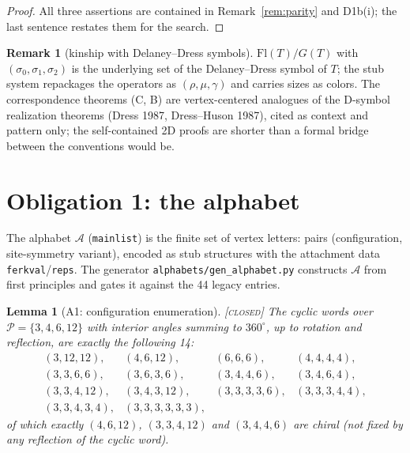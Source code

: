 \documentclass[11pt]{article}
\newtheorem{lemma}[theorem]{Lemma}
\theoremstyle{definition}
\newtheorem{remark}[theorem]{Remark}
\newcommand{\CLOSED}{\textnormal{\textsc{[closed]}}}
\newcommand{\Flags}{\mathrm{Fl}}
\newcommand{\A}{\mathcal{A}}
\begin{document}
\begin{proof}
All three assertions are contained in Remark~\ref{rem:parity} and D1b(i); the last
sentence restates them for the search.
\end{proof}

\begin{remark}[kinship with Delaney--Dress symbols]
$\Flags(T)/G(T)$ with $(\sigma_0, \sigma_1, \sigma_2)$ is the underlying set of the
Delaney--Dress symbol of $T$; the stub system repackages the operators as
$(\rho, \mu, \gamma)$ and carries sizes as colors. The correspondence theorems (C, B) are
vertex-centered analogues of the D-symbol realization theorems (Dress 1987, Dress--Huson
1987), cited as context and pattern only; the self-contained 2D proofs are shorter than a
formal bridge between the conventions would be.
\end{remark}

\section{Obligation 1: the alphabet}\label{sec:alphabet}

The alphabet $\A$ (\texttt{mainlist}) is the finite set of vertex letters: pairs
(configuration, site-symmetry variant), encoded as stub structures with the attachment
data \texttt{ferkval}/\texttt{reps}. The generator \texttt{alphabets/gen\_alphabet.py}
constructs $\A$ from first principles and gates it against the 44 legacy entries.

\begin{lemma}[A1: configuration enumeration]\label{lem:A1} \CLOSED\;
The cyclic words over $\mathcal{P} = \{3,4,6,12\}$ with interior angles summing to
$360^\circ$, up to rotation and reflection, are exactly the following 14:
\[
\begin{array}{llll}
(3,12,12), & (4,6,12), & (6,6,6), & (4,4,4,4),\\
(3,3,6,6), & (3,6,3,6), & (3,4,4,6), & (3,4,6,4),\\
(3,3,4,12), & (3,4,3,12), & (3,3,3,3,6), & (3,3,3,4,4),\\
(3,3,4,3,4), & (3,3,3,3,3,3), &&
\end{array}
\]
of which exactly $(4,6,12)$, $(3,3,4,12)$ and $(3,4,4,6)$ are chiral (not fixed by any
reflection of the cyclic word).
\end{lemma}
\end{document}
